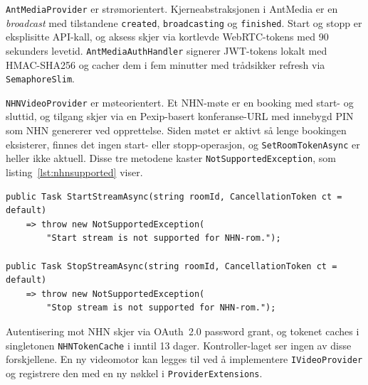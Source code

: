 \texttt{AntMediaProvider} er strømorientert. Kjerneabstraksjonen i
AntMedia er en \textit{broadcast} med tilstandene \texttt{created},
\texttt{broadcasting} og \texttt{finished}. Start og stopp er eksplisitte
API-kall, og aksess skjer via kortlevde WebRTC-tokens med 90 sekunders
levetid. \texttt{AntMediaAuthHandler} signerer JWT-tokens lokalt med
HMAC-SHA256 og cacher dem i fem minutter med trådsikker refresh via
\texttt{SemaphoreSlim}.

\texttt{NHNVideoProvider} er møteorientert. Et NHN-møte er en booking
med start- og sluttid, og tilgang skjer via en Pexip-basert
konferanse-URL med innebygd PIN som NHN genererer ved opprettelse. Siden
møtet er aktivt så lenge bookingen eksisterer, finnes det ingen
start- eller stopp-operasjon, og \texttt{SetRoomTokenAsync} er heller
ikke aktuell. Disse tre metodene kaster \texttt{NotSupportedException},
som listing~\ref{lst:nhnsupported} viser.

\begin{lstlisting}[language={[Sharp]C}, label=lst:nhnsupported,
  caption={NHN-operasjoner som ikke er støttet.}]
public Task StartStreamAsync(string roomId, CancellationToken ct = default)
    => throw new NotSupportedException(
        "Start stream is not supported for NHN-rom.");

public Task StopStreamAsync(string roomId, CancellationToken ct = default)
    => throw new NotSupportedException(
        "Stop stream is not supported for NHN-rom.");
\end{lstlisting}

Autentisering mot NHN skjer via OAuth~2.0 password grant, og tokenet
caches i singletonen \texttt{NHNTokenCache} i inntil 13 dager.
Kontroller-laget ser ingen av disse forskjellene. En ny videomotor kan
legges til ved å implementere \texttt{IVideoProvider} og registrere den
med en ny nøkkel i \texttt{ProviderExtensions}.